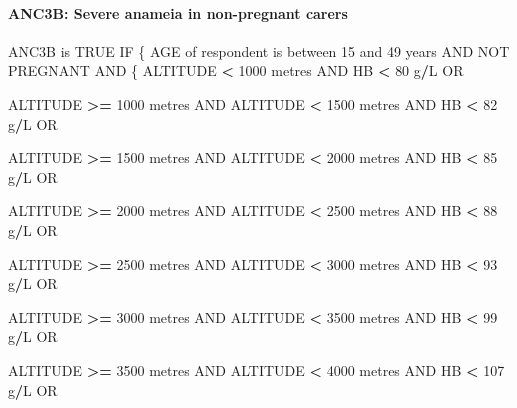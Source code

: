 \documentclass[12pt,a4paper]{article}
\newenvironment{Shaded}{\begin{snugshade}}{\end{snugshade}}
\newcommand{\DecValTok}[1]{\textcolor[rgb]{0.00,0.00,0.81}{#1}}
\newcommand{\NormalTok}[1]{#1}
\newcommand{\OperatorTok}[1]{\textcolor[rgb]{0.81,0.36,0.00}{\textbf{#1}}}
\newcommand{\OtherTok}[1]{\textcolor[rgb]{0.56,0.35,0.01}{#1}}
\newcommand{\StringTok}[1]{\textcolor[rgb]{0.31,0.60,0.02}{#1}}
\let\oldparagraph\paragraph
\renewcommand{\paragraph}[1]{\oldparagraph{#1}\mbox{}}
\begin{document}
\newpage

\hypertarget{anc3b-severe-anameia-in-non-pregnant-carers}{%
\paragraph{ANC3B: Severe anameia in non-pregnant carers}\label{anc3b-severe-anameia-in-non-pregnant-carers}}

\begin{Shaded}
\begin{Highlighting}[]
\NormalTok{ANC3B is }\OtherTok{TRUE}\NormalTok{ IF}
\NormalTok{  \{}
\NormalTok{    AGE of respondent is between }\DecValTok{15}\NormalTok{ and }\DecValTok{49}\NormalTok{ years AND NOT PREGNANT AND}
\NormalTok{      \{}
\NormalTok{        ALTITUDE }\OperatorTok{<}\StringTok{ }\DecValTok{1000}\NormalTok{ metres AND HB }\OperatorTok{<}\StringTok{ }\DecValTok{80}\NormalTok{ g}\OperatorTok{/}\NormalTok{L OR}
     
\NormalTok{        ALTITUDE }\OperatorTok{>=}\StringTok{ }\DecValTok{1000}\NormalTok{ metres AND ALTITUDE }\OperatorTok{<}\StringTok{ }\DecValTok{1500}\NormalTok{ metres AND HB }\OperatorTok{<}\StringTok{ }\DecValTok{82}\NormalTok{ g}\OperatorTok{/}\NormalTok{L OR}
     
\NormalTok{        ALTITUDE }\OperatorTok{>=}\StringTok{ }\DecValTok{1500}\NormalTok{ metres AND ALTITUDE }\OperatorTok{<}\StringTok{ }\DecValTok{2000}\NormalTok{ metres AND HB }\OperatorTok{<}\StringTok{ }\DecValTok{85}\NormalTok{ g}\OperatorTok{/}\NormalTok{L OR}

\NormalTok{        ALTITUDE }\OperatorTok{>=}\StringTok{ }\DecValTok{2000}\NormalTok{ metres AND ALTITUDE }\OperatorTok{<}\StringTok{ }\DecValTok{2500}\NormalTok{ metres AND HB }\OperatorTok{<}\StringTok{ }\DecValTok{88}\NormalTok{ g}\OperatorTok{/}\NormalTok{L OR}

\NormalTok{        ALTITUDE }\OperatorTok{>=}\StringTok{ }\DecValTok{2500}\NormalTok{ metres AND ALTITUDE }\OperatorTok{<}\StringTok{ }\DecValTok{3000}\NormalTok{ metres AND HB }\OperatorTok{<}\StringTok{ }\DecValTok{93}\NormalTok{ g}\OperatorTok{/}\NormalTok{L OR}

\NormalTok{        ALTITUDE }\OperatorTok{>=}\StringTok{ }\DecValTok{3000}\NormalTok{ metres AND ALTITUDE }\OperatorTok{<}\StringTok{ }\DecValTok{3500}\NormalTok{ metres AND HB }\OperatorTok{<}\StringTok{ }\DecValTok{99}\NormalTok{ g}\OperatorTok{/}\NormalTok{L OR}

\NormalTok{        ALTITUDE }\OperatorTok{>=}\StringTok{ }\DecValTok{3500}\NormalTok{ metres AND ALTITUDE }\OperatorTok{<}\StringTok{ }\DecValTok{4000}\NormalTok{ metres AND HB }\OperatorTok{<}\StringTok{ }\DecValTok{107}\NormalTok{ g}\OperatorTok{/}\NormalTok{L OR}


\end{Highlighting}
\end{Shaded}
\end{document}
